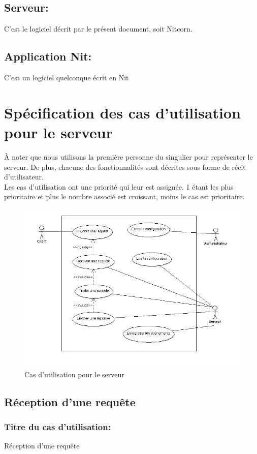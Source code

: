 \documentclass{scrreprt}
\begin{document}
\subsection{Serveur:} C'est le logiciel décrit par le présent document, soit Nitcorn.
\subsection{Application Nit:} C'est un logiciel quelconque écrit en Nit

\section{Spécification des cas d'utilisation pour le serveur} 
À noter que nous utilisons la première personne du singulier pour représenter le serveur. De plus, chacune des fonctionnalités sont décrites sous forme de récit d'utilisateur.\\
Les cas d'utilisation ont une priorité qui leur est assignée. 1 étant les plus prioritaire et plus le nombre associé est croissant, moins le cas est prioritaire.

\begin{figure}[h]
\caption{Cas d'utilisation pour le serveur}	
\includegraphics[width=\textwidth]{./diagram/section32.png}	
\end{figure}
\subsection{Réception d'une requête}
\subsubsection{Titre du cas d'utilisation:} Réception d'une requête
\end{document}
